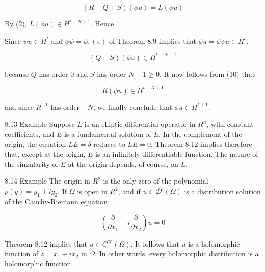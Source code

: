 \documentclass[10pt]{article}
\begin{document}
$$
(R-Q+S)(\phi u)=L(\phi u)
$$

By (2), $L(\phi u) \in H^{t-N+1}$. Hence

Since $\psi u \in H^{t}$ and $\phi \psi=\phi,(e)$ of Theorem 8.9 implies that $\phi u=\phi \psi u \in H^{t}$.

$$
(Q-S)(\phi u) \in H^{t-N+1}
$$

because $Q$ has order 0 and $S$ has order $N-1 \geq 0$. It now follows from (10) that

$$
R(\phi u) \in H^{t-N+1}
$$

and since $R^{-1}$ has order $-N$, we finally conclude that $\phi u \in H^{t+1}$.

8.13 Example Suppose $L$ is an elliptic differential operator in $R^{n}$, with constant coefficients, and $E$ is a fundamental solution of $L$. In the complement of the origin, the equation $L E=\delta$ reduces to $L E=0$. Theorem 8.12 implies therefore that, except at the origin, $E$ is an infinitely differentiable function. The nature of the singularity of $E$ at the origin depends, of course, on $L$.

8.14 Example The origin in $R^{2}$ is the only zero of the polynomial $p(y)=y_{1}+i y_{2}$. If $\Omega$ is open in $R^{2}$, and if $u \in \mathscr{D}^{\prime}(\Omega)$ is a distribution solution of the Cauchy-Riemann equation

$$
\left(\frac{\partial}{\partial x_{1}}+i \frac{\partial}{\partial x_{2}}\right) u=0
$$

Theorem 8.12 implies that $u \in C^{\infty}(\Omega)$. It follows that $u$ is a holomorphic function of $z=x_{1}+i x_{2}$ in $\Omega$. In other words, every holomorphic distribution is a holomorphic function.
\end{document}
